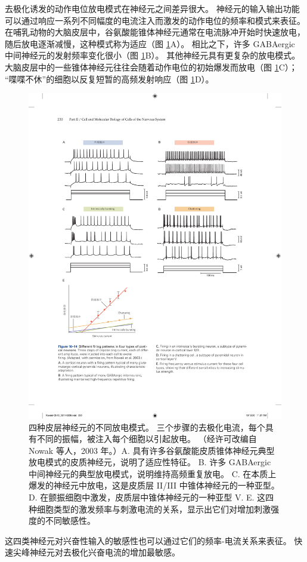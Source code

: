 去极化诱发的动作电位放电模式在神经元之间差异很大。 神经元的输入输出功能可以通过响应一系列不同幅度的电流注入而激发的动作电位的频率和模式来表征。 
在哺乳动物的大脑皮层中，谷氨酸能锥体神经元通常在电流脉冲开始时快速放电，随后放电逐渐减慢，这种模式称为适应（图 \ref{fig:10_14}A）。 
相比之下，许多 GABAergic 中间神经元的发射频率变化很小（图 \ref{fig:10_14}B）。 
其他神经元具有更复杂的放电模式。 大脑皮层中的一些锥体神经元往往会随着动作电位的初始爆发而放电（图 \ref{fig:10_14}C）； “喋喋不休”的细胞以反复短暂的高频发射响应（图 \ref{fig:10_14}D）。


\begin{figure}[htbp]
	\centering
	\includegraphics[width=0.75\linewidth]{chap10/fig_10_14}
	\caption{四种皮层神经元的不同放电模式。 三个步骤的去极化电流，每个具有不同的振幅，被注入每个细胞以引起放电。 （经许可改编自 Nowak 等人，2003 年。）A. 具有许多谷氨酸能皮质锥体神经元典型放电模式的皮质神经元，说明了适应性特征。 B. 许多 GABAergic 中间神经元的典型放电模式，说明维持高频重复放电。 C. 在本质上爆发的神经元中放电，这是皮质层 II/III 中锥体神经元的一种亚型。 D. 在颤振细胞中激发，皮质层中锥体神经元的一种亚型 V. E. 这四种细胞类型的激发频率与刺激电流的关系，显示出它们对增加刺激强度的不同敏感性。}
	\label{fig:10_14}
\end{figure}


这四类神经元对兴奋性输入的敏感性也可以通过它们的频率-电流关系来表征。 
快速尖峰神经元对去极化兴奋电流的增加最敏感。


